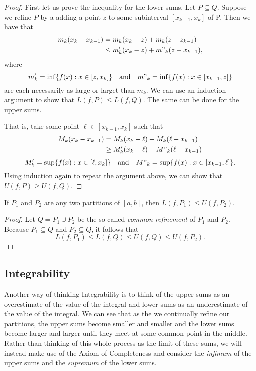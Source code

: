 \begin{proof}
	First let us prove the inequality for the lower sums. Let \( P \subseteq Q  \). Suppose we refine \( P  \) by a adding a point \( z  \) to some subinterval \(  [x_{k-1}, x_{k }] \) of P. Then we have that 
	\begin{align*}
	    m_{k } ( x_{k } - x_{ k -1 })&= m_{  k } (x_{k } - z ) + m_{ k } (z - z _{k -1 })  \\
									 &\leq m'_{k }( x_{k } - z ) + m"_{k} (z - x_{k -1 }),
	\end{align*}
	where 
	\[  m'_{k} = \inf \{ f(x) : x \in [z, x_{k }] \} \  \ \text{ and } \  \ m"_{k} = \inf \{ f(x) : x \in [x_{k -1 }, z ] \}  \]
	are each necessarily as large or larget than \( m_k  \). We can use an induction argument to show that \(  L(f, P ) \leq L(f,Q) \). The same can be done for the upper sums.

	That is, take some point \( \ell \in [x_{k-1}, x_{k }] \) such that 
	\begin{align*}
	    M_{k } (x_{k} - x_{k -1 }) &= M_{k } (x_{ k } - \ell ) + M_{k } ( \ell - x_{k -1 }) \\
								   &\geq M_k' (x_{k } - \ell ) + M"_{k } (\ell - x_{k -1 }) \\
	\end{align*}
	\[  M'_{k} = \sup \{ f(x) : x \in [\ell, x_{k }] \} \  \ \text{ and } \  \ M"_{k}= \sup \{ f(x) : x \in [x_{k -1 }, \ell ] \}.  \]
	Using induction again to repeat the argument above, we can show that \( U(f, P) \geq U(f,Q) \).
\end{proof}

\begin{lemma}
	If \( P_1  \) and \( P_2  \) are any two partitions of \( [a,b]  \), then \( L(f, P_{1}) \leq U(f, P_2) \).
\end{lemma}

\begin{proof}
Let \( Q = P_{1} \cup P_{2}  \) be the so-called \textit{common refinement} of \( P_{1} \) and \( P_{2} \). Because \(  P_{1} \subseteq Q  \) and \( P_{2} \subseteq Q  \), it follows that 
\[ L(f, P_{1}) \leq L(f,Q) \leq U(f,Q) \leq U(f, P_{2}).  \]
\end{proof}


\subsection{Integrability}

Another way of thinking Integrability is to think of the upper sums as an overestimate of the value of the integral and lower sums as an underestimate of the value of the integral. We can see that as the we continually refine our partitions, the upper sums become smaller and smaller and the lower sums become larger and larger until they meet at some common point in the middle. 
	Rather than thinking of this whole process as the limit of these sums, we will instead make use of the Axiom of Completeness and consider the \textit{infimum} of the upper sums and the \textit{supremum} of the lower sums.

